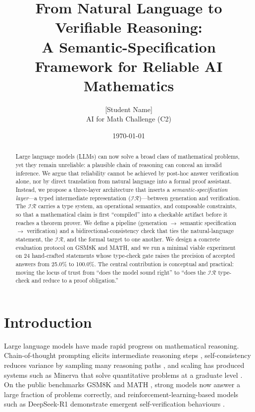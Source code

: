 \documentclass[11pt]{article}
\title{From Natural Language to Verifiable Reasoning:\\ A Semantic-Specification Framework for Reliable AI Mathematics}
\author{[Student Name]\\ \small AI for Math Challenge (C2)}
\date{\today}
\newcommand{\IR}{\ensuremath{\mathcal{IR}}}
\begin{document}
\maketitle

\begin{abstract}
Large language models (LLMs) can now solve a broad class of mathematical
problems, yet they remain unreliable: a plausible chain of reasoning can
conceal an invalid inference. We argue that reliability cannot be achieved by
post-hoc answer verification alone, nor by direct translation from natural
language into a formal proof assistant. Instead, we propose a three-layer
architecture that inserts a \emph{semantic-specification layer}---a typed
intermediate representation (\IR{})---between generation and verification. The
\IR{} carries a type system, an operational semantics, and composable
constraints, so that a mathematical claim is first ``compiled'' into a
checkable artifact before it reaches a theorem prover. We define a pipeline
(generation $\rightarrow$ semantic specification $\rightarrow$ verification)
and a bidirectional-consistency check that ties the natural-language statement,
the \IR{}, and the formal target to one another. We design a concrete evaluation
protocol on GSM8K and MATH, and we run a minimal viable experiment on 24
hand-crafted statements whose type-check gate raises the precision of accepted
answers from 25.0\% to 100.0\%. The central contribution is conceptual and
practical: moving the locus of trust from ``does the model sound right'' to
``does the \IR{} type-check and reduce to a proof obligation.''
\end{abstract}

\section{Introduction}
\label{sec:intro}

Large language models have made rapid progress on mathematical reasoning.
Chain-of-thought prompting elicits intermediate reasoning steps
\citep{wei2022chain}, self-consistency reduces variance by sampling many
reasoning paths \citep{wang2022selfconsistency}, and scaling has produced
systems such as Minerva that solve quantitative problems at a graduate level
\citep{lewkowycz2022solving}. On the public benchmarks GSM8K
\citep{cobbe2021training} and MATH \citep{hendrycks2021measuring}, strong
models now answer a large fraction of problems correctly, and
reinforcement-learning-based models such as DeepSeek-R1 demonstrate emergent
self-verification behaviours \citep{deepseek2025r1}.
\end{document}
